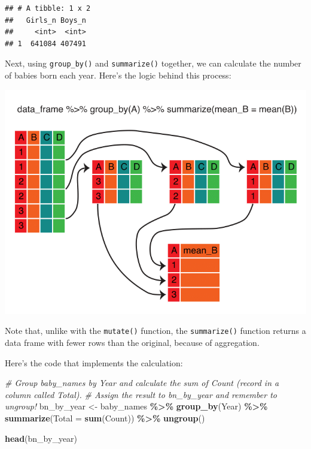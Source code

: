 \documentclass[
]{book}
\newenvironment{Shaded}{\begin{snugshade}}{\end{snugshade}}
\newcommand{\CommentTok}[1]{\textcolor[rgb]{0.56,0.35,0.01}{\textit{#1}}}
\newcommand{\DataTypeTok}[1]{\textcolor[rgb]{0.13,0.29,0.53}{#1}}
\newcommand{\KeywordTok}[1]{\textcolor[rgb]{0.13,0.29,0.53}{\textbf{#1}}}
\newcommand{\NormalTok}[1]{#1}
\newcommand{\OperatorTok}[1]{\textcolor[rgb]{0.81,0.36,0.00}{\textbf{#1}}}
\newcommand{\StringTok}[1]{\textcolor[rgb]{0.31,0.60,0.02}{#1}}
\begin{document}
\begin{verbatim}
## # A tibble: 1 x 2
##   Girls_n Boys_n
##     <int>  <int>
## 1  641084 407491
\end{verbatim}

Next, using \texttt{group\_by()} and \texttt{summarize()} together, we can calculate the number of babies born each year. Here's the logic behind this process:

\includegraphics{R/Rintro/images/summarize_group_by.png}

Note that, unlike with the \texttt{mutate()} function, the \texttt{summarize()} function returns a data frame with fewer rows than the original, because of aggregation.

Here's the code that implements the calculation:

\begin{Shaded}
\begin{Highlighting}[]
\CommentTok{\# Group baby\_names by Year and calculate the sum of Count (record in a column called Total). }
\CommentTok{\# Assign the result to bn\_by\_year and remember to ungroup!}
\NormalTok{bn\_by\_year \textless{}{-}}
\StringTok{  }\NormalTok{baby\_names }\OperatorTok{\%\textgreater{}\%}
\StringTok{  }\KeywordTok{group\_by}\NormalTok{(Year) }\OperatorTok{\%\textgreater{}\%}
\StringTok{  }\KeywordTok{summarize}\NormalTok{(}\DataTypeTok{Total =} \KeywordTok{sum}\NormalTok{(Count)) }\OperatorTok{\%\textgreater{}\%}
\StringTok{  }\KeywordTok{ungroup}\NormalTok{()}

\KeywordTok{head}\NormalTok{(bn\_by\_year)}
\end{Highlighting}
\end{Shaded}
\end{document}
